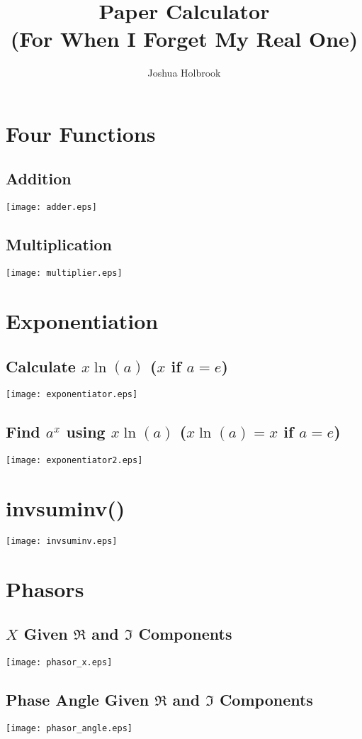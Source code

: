 \documentclass[letterpaper]{report}
\title{Paper Calculator \\ (For When I Forget My Real One)}
\author{Joshua Holbrook}
\begin{document}
\maketitle

\section{Four Functions}
\subsection{Addition}
\texttt{[image: adder.eps]}

\subsection{Multiplication}
\texttt{[image: multiplier.eps]}

\section{Exponentiation}
\subsection{Calculate $x\ln(a)$ ($x$ if $a=e$)}
\texttt{[image: exponentiator.eps]} \\
\subsection{Find $a^x$ using $x\ln(a)$ ($x\ln(a)=x$ if $a=e$)}
\texttt{[image: exponentiator2.eps]}

\section{invsuminv()}
\texttt{[image: invsuminv.eps]}

\section{Phasors}
\subsection{\(X\) Given $\Re$ and $\Im$ Components}
\texttt{[image: phasor\_x.eps]}

\subsection{Phase Angle Given $\Re$ and $\Im$ Components}
\texttt{[image: phasor\_angle.eps]}
\end{document}

